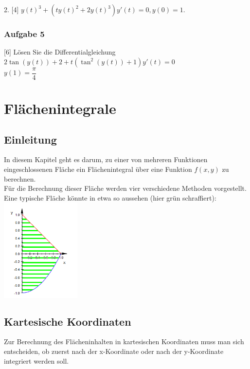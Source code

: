 \documentclass[11pt,final]{scrreprt}
\newcommand{\br} {\medskip\\}
\begin{document}
2. [4] $y(t)^3 + (ty(t)^2 + 2y(t)^3)y'(t) = 0, y(0) = 1.$\\

\subsection{Aufgabe 5}

[6] Lösen Sie die Differentialgleichung\\

$2 \tan(y(t)) + 2 + t \left(\tan^2 (y(t)) + 1\right)y'(t) = 0$\\
$y(1) =\dfrac{\pi}{4}$\\

\chapter{Flächenintegrale}

\section{Einleitung}

In diesem Kapitel geht es darum, zu einer von mehreren Funktionen eingeschlossenen Fläche ein Flächenintegral über eine Funktion $f(x, y)$ zu berechnen.\\
Für die Berechnung dieser Fläche werden vier verschiedene Methoden vorgestellt.\\
Eine typische Fläche könnte in etwa so aussehen (hier grün schraffiert):\\
\includegraphics[width=4cm]{images/flaechenintegral/skizze.png}\br

\section{Kartesische Koordinaten}

Zur Berechnung des Flächeninhalten in kartesischen Koordinaten muss man sich entscheiden, ob zuerst nach der x-Koordinate oder nach der y-Koordinate integriert werden soll.\\
\end{document}
